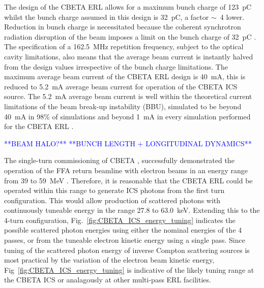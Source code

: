 \documentclass[../main.tex]{subfiles}
\begin{document}
The design of the CBETA ERL \cite{hoffstaetter2017cbeta} allows for a maximum bunch charge of 123~\si{\pico\coulomb} whilst the bunch charge assumed in this design is 32~\si{\pico\coulomb}, a factor $\sim$~4 lower. Reduction in bunch charge is necessitated because the coherent synchrotron radiation disruption of the beam imposes a limit on the bunch charge of 32~\si{\pico\coulomb} \cite{lou2020coherent}. The specification of a 162.5~\si{\mega\hertz} repetition frequency, subject to the optical cavity limitations, also means that the average beam current is instantly halved from the design values irrespective of the bunch charge limitations. The maximum average beam current of the CBETA ERL design is 40~\si{\milli\ampere}, this is reduced to 5.2~\si{\milli\ampere} average beam current for operation of the CBETA ICS source. The 5.2~\si{\milli\ampere} average beam current is well within the theoretical current limitations of the beam break-up instability (BBU), simulated to be beyond 40~\si{\milli\ampere} in 98\% of simulations and beyond 1~\si{\milli\ampere} in every simulation performed for the CBETA ERL \cite{lou2019beam}.   

\textcolor{blue}{**BEAM HALO?**}
\textcolor{blue}{**BUNCH LENGTH + LONGITUDINAL DYNAMICS**}

The single-turn commissioning of CBETA \cite{gulliford2021measurement}, successfully demonstrated the operation of the FFA return beamline with electron beams in an energy range from 39 to 59~\si{\mega\electronvolt} \cite{gulliford2019beam,gulliford2021measurement}. Therefore, it is reasonable that the CBETA ERL could be operated within this range to generate ICS photons from the first turn configuration. This would allow production of scattered photons with continuously tuneable energy in the range 27.8 to 63.0~\si{\kilo\electronvolt}. Extending this to the 4-turn configuration, Fig.~\ref{fig:CBETA_ICS_energy_tuning} indicates the possible scattered photon energies using either the nominal energies of the 4 passes, or from the tuneable electron kinetic energy using a single pass. Since tuning of the scattered photon energy of inverse Compton scattering sources is most practical by the variation of the electron beam kinetic energy, Fig~\ref{fig:CBETA_ICS_energy_tuning} is indicative of the likely tuning range at the CBETA ICS or analagously at other multi-pass ERL facilities.  
\end{document}
